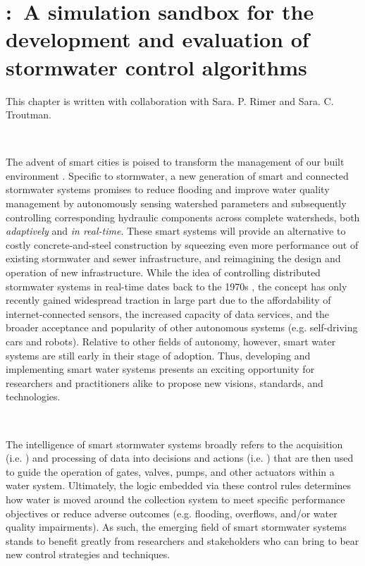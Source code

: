 \chapter{\pystormsNOSPACE:\ A simulation sandbox for the development and evaluation of stormwater control algorithms}\label{ch:pystorms}
\vspace{2cm}
%
%
%
This chapter is written with collaboration with Sara. P. Rimer and Sara. C. Troutman.

\

The advent of smart cities is poised to transform the management of our built environment \citep{Chourabi2012, Harrison2011}. Specific to stormwater, a new generation of smart and connected stormwater systems promises to reduce flooding and improve water quality management by autonomously sensing watershed parameters and subsequently controlling corresponding hydraulic components across complete watersheds, both \emph{adaptively} and \emph{in real-time}. These smart systems will provide an alternative to costly concrete-and-steel construction by squeezing even more performance out of existing stormwater and sewer infrastructure, and reimagining the design and operation of new infrastructure. While the idea of controlling distributed stormwater systems in real-time dates back to the 1970s \citep{Trotta1977}, the concept has only recently gained widespread traction in large part due to the affordability of internet-connected sensors, the increased capacity of data services, and the broader acceptance and popularity of other autonomous systems (e.g. self-driving cars and robots). Relative to other fields of autonomy, however, smart water systems are still early in their stage of adoption. Thus, developing and implementing smart water systems presents an exciting opportunity for researchers and practitioners alike to propose new visions, standards, and technologies.

 \
 
The intelligence of smart stormwater systems broadly refers to the acquisition (i.e. ) and processing of data into decisions and actions (i.e. ) that are then used to guide the operation of gates, valves, pumps, and other actuators within a water system. Ultimately, the logic embedded via these control rules determines how water is moved around the collection system to meet specific performance objectives or reduce adverse outcomes (e.g. flooding, overflows, and/or water quality impairments). As such, the emerging field of smart stormwater systems stands to benefit greatly from researchers and stakeholders who can bring to bear new control strategies and techniques.

